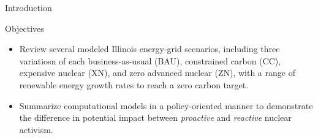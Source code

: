 \documentclass[final]{beamer}
\newlength{\onecolwid}
\newlength{\threecolwid}
\begin{document}
\begin{frame}[t]
\begin{columns}[t,totalwidth=\threecolwid]
\begin{column}{\onecolwid}
\begin{block}{Introduction}
	
	
	\end{block}
	
	
	\begin{alertblock}{Objectives}
	\begin{itemize}
			\item Review several modeled Illinois energy-grid scenarios, including three variatiosn of each business-as-usual (BAU), constrained carbon (CC), expensive nuclear (XN), and zero advanced nuclear (ZN), with a range of renewable energy growth rates to reach a zero carbon target.
		\item Summarize computational models in a policy-oriented manner to demonstrate the difference in potential impact between \textit{proactive} and \textit{reactive} nuclear activism.
	\end{itemize}
	
	\end{alertblock}



\end{column}
\end{columns}
\end{frame}
\end{document}
